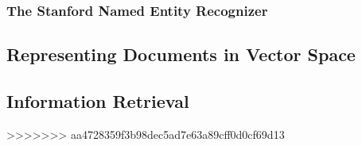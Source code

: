 \subsubsection{The Stanford Named Entity Recognizer}\label{sec:stanford_named_entity_recognizer}


\subsection{Representing Documents in Vector Space}\label{sec:representing_documents_in_vector_space}


\subsection{Information Retrieval}\label{sec:information_retrieval}

>>>>>>> aa4728359f3b98dec5ad7e63a89cff0d0cf69d13
